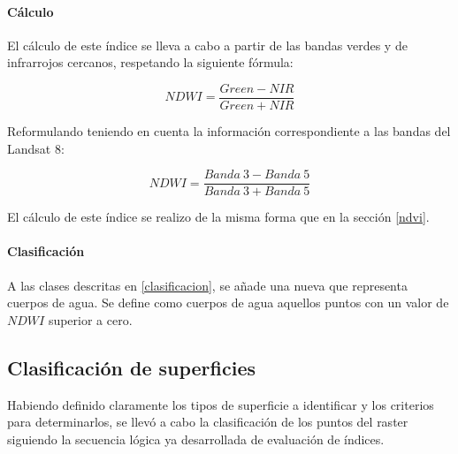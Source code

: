 \paragraph{Cálculo}

El cálculo de este índice se lleva a cabo a partir de las bandas verdes y de infrarrojos cercanos, respetando la siguiente fórmula:

$$NDWI = \frac{Green - NIR}{Green + NIR}$$

Reformulando teniendo en cuenta la información correspondiente a las bandas del Landsat 8:

$$NDWI = \frac{Banda~3-Banda~5}{Banda~3+Banda~5}$$

El cálculo de este índice se realizo de la misma forma que en la sección \ref{ndvi}.


\paragraph{Clasificación} 

A las clases descritas en \ref{clasificacion}, se añade una nueva que representa cuerpos de agua. Se define como cuerpos de agua aquellos puntos con un valor de $NDWI$ superior a cero.


\subsection{Clasificación de superficies}

Habiendo definido claramente los tipos de superficie a identificar y los criterios para determinarlos, se llevó a cabo la clasificación de los puntos del raster siguiendo la secuencia lógica ya desarrollada de evaluación de índices.
